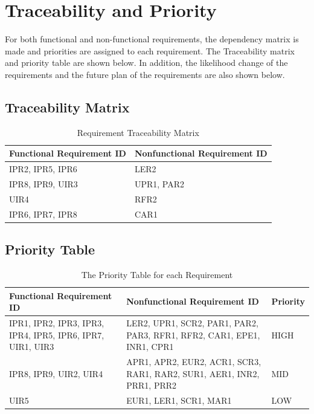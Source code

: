 \documentclass[12pt]{article}
\begin{document}
\section{Traceability and Priority}
For both functional and non-functional requirements, the dependency matrix is made and priorities are assigned to each requirement. The Traceability matrix and priority table are shown below. In addition, the likelihood change of the requirements and the future plan of the requirements are also shown below.

\subsection{Traceability Matrix}
\begin{table}[H]
\begin{tabular}{|p{}| p{}|}

\hline Functional Requirement ID & Nonfunctional Requirement ID\\

\hline IPR2, IPR5, IPR6 & LER2\\

\hline IPR8, IPR9, UIR3 & UPR1, PAR2\\
\hline UIR4 & RFR2\\
\hline IPR6, IPR7, IPR8 & CAR1\\
\hline

\end{tabular}
\caption{Requirement Traceability Matrix}
\end{table}

\subsection{Priority Table}
\begin{table}[H]
\begin{tabular}{|p{}|p{}|p{}|}

\hline Functional Requirement ID&Nonfunctional Requirement ID&Priority\\

\hline IPR1, IPR2, IPR3, IPR3, IPR4, IPR5, IPR6, IPR7, UIR1, UIR3 & LER2, UPR1, SCR2, PAR1, PAR2, PAR3, RFR1, RFR2, CAR1, EPE1, INR1, CPR1 & HIGH\\

\hline IPR8, IPR9, UIR2, UIR4 & APR1, APR2, EUR2, ACR1, SCR3, RAR1, RAR2, SUR1, AER1, INR2, PRR1, PRR2 & MID\\

\hline UIR5 & EUR1, LER1, SCR1, MAR1 & LOW\\

\hline

\end{tabular}
\caption{The Priority Table for each Requirement}
\end{table}
\end{document}
